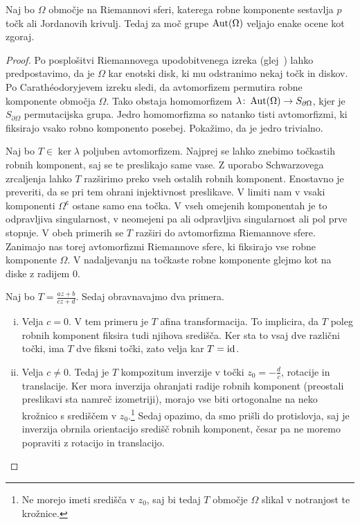 \begin{izrek}
Naj bo $\Omega$ območje na Riemannovi sferi, katerega robne
komponente sestavlja $p$ točk ali Jordanovih krivulj. Tedaj za
moč grupe $\operatorname{Aut}(\Omega)$ veljajo enake ocene kot zgoraj.
\end{izrek}

\begin{proof}
Po posplošitvi Riemannovega upodobitvenega izreka
(glej~\cite{Koebe_uni}) lahko predpostavimo, da je $\Omega$ kar
enotski disk, ki mu odstranimo nekaj točk in diskov. Po
Carathéodoryjevem izreku \cite[izrek~5.1.1 in opomba~5.1.2]{krantz}
sledi, da avtomorfizem permutira robne komponente območja $\Omega$.
Tako obstaja homomorfizem
$\lambda \colon \operatorname{Aut}(\Omega) \to S_{\partial \Omega}$, kjer je
$S_{\partial{\Omega}}$ permutacijska grupa. Jedro homomorfizma so
natanko tisti avtomorfizmi, ki fiksirajo vsako robno komponento
posebej. Pokažimo, da je jedro trivialno.

Naj bo $T \in \ker \lambda$ poljuben avtomorfizem. Najprej se lahko
znebimo točkastih robnih komponent, saj se te preslikajo same vase.
Z uporabo Schwarzovega zrcaljenja lahko $T$ razširimo preko vseh
ostalih robnih komponent. Enostavno je preveriti, da se pri tem
ohrani injektivnost preslikave. V limiti nam v vsaki komponenti
$\Omega^\mathsf{c}$ ostane samo ena točka. V vseh omejenih
komponentah je to odpravljiva singularnost, v neomejeni pa ali
odpravljiva singularnost ali pol prve stopnje. V obeh primerih se
$T$ razširi do avtomorfizma Riemannove sfere. Zanimajo nas torej
avtomorfizmi Riemannove sfere, ki fiksirajo vse robne komponente
$\Omega$. V nadaljevanju na točkaste robne komponente glejmo kot na
diske z radijem $0$.

Naj bo $T = \frac{az + b}{cz + d}$. Sedaj obravnavajmo dva primera.

\begin{enumerate}[i)]
\item Velja $c=0$. V tem primeru je $T$ afina transformacija. To
implicira, da $T$ poleg robnih komponent fiksira tudi njihova
središča. Ker sta to vsaj dve različni točki, ima $T$ dve fiksni
točki, zato velja kar $T = \operatorname{id}$.

\item Velja $c \ne 0$. Tedaj je $T$ kompozitum inverzije v točki
$z_0 = -\frac{d}{c}$, rotacije in translacije. Ker mora inverzija
ohranjati radije robnih komponent (preostali preslikavi sta namreč
izometriji), morajo vse biti ortogonalne na neko krožnico s
središčem v $z_0$.\footnote{Ne morejo imeti središča v $z_0$, saj
bi tedaj $T$ območje $\Omega$ slikal v notranjost te krožnice.}
Sedaj opazimo, da smo prišli do protislovja, saj je inverzija
obrnila orientacijo središč robnih komponent, česar pa ne moremo
popraviti z rotacijo in translacijo.
\end{enumerate}


\end{proof}
